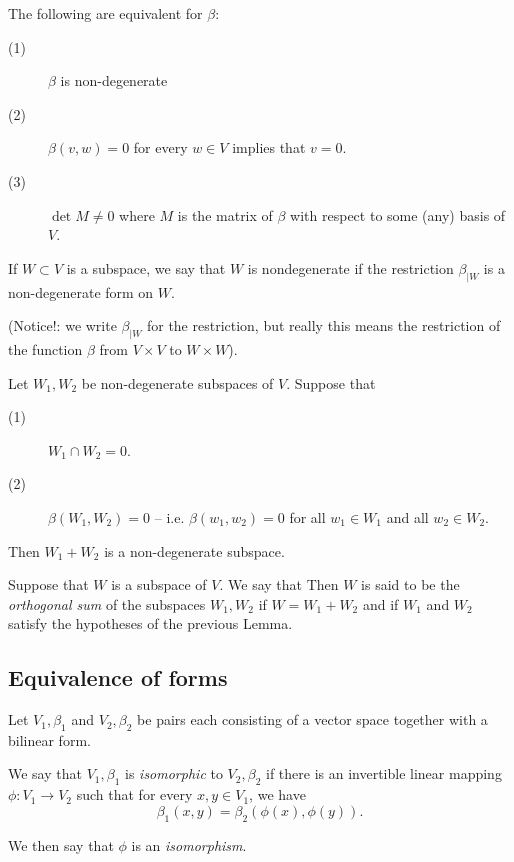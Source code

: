 \documentclass[11pt]{article}
\numberwithin{equation}{section}
\begin{document}
\begin{lemma}
The following are equivalent for \(\beta\):
\begin{description}
\item[{(1)}] \(\beta\) is non-degenerate
\item[{(2)}] \(\beta(v,w) = 0\) for every \(w \in V\) implies that \(v = 0\).
\item[{(3)}] \(\det M\ne 0\) where \(M\) is the matrix of \(\beta\) with
respect to some (any) basis of \(V\).
\end{description}
\label{lemma:non-deg-condition}
\end{lemma}

If \(W \subset V\) is a subspace, we say that \(W\) is nondegenerate
if the restriction \(\beta_{\mid W}\) is a non-degenerate form on
\(W\).

(Notice!: we write \(\beta_{\mid W}\) for the restriction, but really
this means the restriction of the function \(\beta\) from \(V\times V\)
to \(W \times W\)).

\begin{lemma}
Let \(W_1,W_2\) be non-degenerate subspaces of \(V\).
Suppose that
\begin{description}
\item[{(1)}] \(W_1 \cap W_2 = 0\).
\item[{(2)}] \(\beta(W_1,W_2) = 0\) -- i.e. \(\beta(w_1,w_2) = 0\) for all
\(w_1 \in W_1\) and all \(w_2 \in W_2\).
\end{description}
Then \(W_1 + W_2\) is a non-degenerate subspace.
\label{lemma:orthog-sum}
\end{lemma}

Suppose that \(W\) is a subspace of \(V\). We say that Then \(W\) is
said to be the \emph{orthogonal sum} of the subspaces \(W_1, W_2\)
if \(W= W_1 + W_2\) and if \(W_1\) and \(W_2\) satisfy the hypotheses
of the previous Lemma.
\subsection{Equivalence of forms}
\label{sec:equivalence-of-forms}
Let \(V_1,\beta_1\) and \(V_2,\beta_2\) be pairs each consisting of a
vector space together with a bilinear form.

We say that \(V_1,\beta_1\) is \emph{isomorphic} to \(V_2,\beta_2\) if
there is an invertible linear mapping \(\phi:V_1 \to V_2\) such that
for every \(x,y \in V_1\), we have \[\beta_1(x,y) =
\beta_2(\phi(x),\phi(y)).\]

We then say that \(\phi\) is an \emph{isomorphism}.
\end{document}
